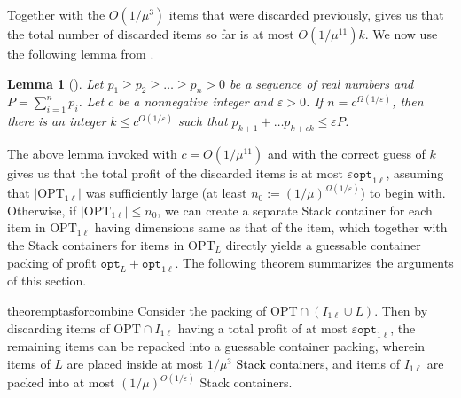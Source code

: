 \documentclass[10pt,a4paper]{amsart}
\newcommand{\kvnnew}[1]{\textcolor{black}{#1}}
\newcommand{\akr}[1]{}
\renewcommand{\epsilon}{\varepsilon} %
\newtheorem{lemma}[theorem]{Lemma}
\theoremstyle{definition}
\newcommand{\hmax}{\mu}
\newcommand{\opt}{\mathtt{opt}}
\newcommand{\optonel}{\mathtt{opt}_{1\ell}}
\newcommand{\OPT}{\mathrm{OPT}}
\newcommand{\OPTonel}{\text{OPT}_{1\ell}}
\newcommand{\OPTL}{\text{OPT}_L}
\begin{document}
Together with the $O(1/\mu^3)$ items that were discarded previously,  gives us that the total number of discarded items so far is at most $O(1/\mu^{11})k$. We now use the following lemma from \cite{jansen1999improved}.
\begin{lemma}[\cite{jansen1999improved}]
    Let $p_1\ge p_2\ge \ldots \ge p_n>0$ be a sequence of real numbers and $P=\sum_{i=1}^{n} p_i$. Let $c$ be a nonnegative integer and $\epsilon >0$. If $n = c^{\Omega(1/\epsilon)}$, then there is an integer $k \le c^{O(1/\epsilon)}$ such that $p_{k+1}+\ldots p_{k+ck} \le \epsilon P$.
    
\end{lemma}


The above lemma invoked with $c=O(1/\hmax^{11})$ and with the correct guess of $k$ gives us that the total profit of the discarded items is at most $\epsilon \optonel$, assuming that $|\OPTonel|$ was sufficiently large (at least $n_0 := (1/\mu)^{\Omega(1/\epsilon)}$) to begin with. Otherwise, if $|\OPTonel| \le n_0$, we can create a separate Stack container for each item in $\OPTonel$ having dimensions same as that of the item, which together with the Stack containers for items in $\OPTL$ directly yields a guessable container packing of profit $\opt_L + \optonel$. The following theorem summarizes the arguments of this section.

\begin{restatable}{theorem}{ptasforcombine}
    Consider the packing of $\OPT\cap (I_{1\ell}\cup L)$.
    Then by discarding items of $\OPT\cap I_{1\ell}$ having a total profit of at most $\epsilon\optonel$, the remaining items can be repacked into a guessable container packing, wherein items of $L$ are placed inside at most $1/\hmax^3$ \kvnnew{Stack} containers, and items of $I_{1\ell}$ are packed into at most $(1/\mu)^{O(1/\epsilon)}$ Stack containers.
\end{restatable}





\end{document}
